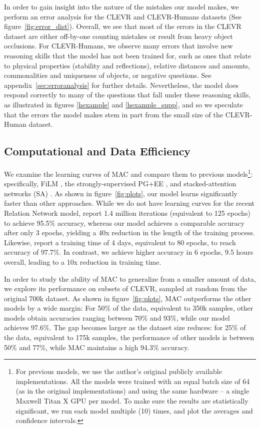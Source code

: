 \documentclass[fleqn]{article}
\newcommand{\figref}[1]{figure~\ref{fig:#1}}
\newcommand{\appref}[1]{appendix~\ref{sec:#1}}
\begin{document}
In order to gain insight into the nature of the mistakes our model makes, we perform an error analysis for the CLEVR and CLEVR-Humans datasets (See \figref{error_dist}). Overall, we see that most of the errors in the CLEVR dataset are either off-by-one counting mistakes or result from heavy object occlusions. For CLEVR-Humans, we observe many errors that involve new reasoning skills that the model has not been trained for, such as ones that relate to physical properties (stability and reflections), relative distances and amounts, commonalities and uniqueness of objects, or negative questions. See \appref{erroranalysis} for further details. Nevertheless, the model does respond correctly to many of the questions that fall under these reasoning skills, as illustrated in figures \ref{hexample} and \ref{hexample_supp}, and so we speculate that the errors the model makes stem in part from the small size of the CLEVR-Human dataset.

\subsection{Computational and Data Efficiency}

We examine the learning curves of MAC and compare them to previous models\footnote{For previous models, we use the author's original publicly available implementations. All the models were trained with an equal batch size of 64 (as in the original implementations) and using the same hardware -- a single Maxwell Titan X GPU per model. To make sure the results are statistically significant, we run each model multiple (10) times, and plot the averages and confidence intervals.}: specifically, FiLM \citep{film}, the strongly-supervised PG+EE \citep{pgee}, and stacked-attention networks (SA) \citep{pgee, saAtt}. As shown in \figref{plots}, our model learns significantly faster than other approaches. While we do not have learning curves for the recent Relation Network model, \citet{rn} report 1.4 million iterations (equivalent to 125 epochs) to achieve 95.5\% accuracy, whereas our model achieves a comparable accuracy after only 3 epochs, yielding a 40x reduction in the length of the training process. Likewise, \citet{film} report a training time of 4 days, equivalent to 80 epochs, to reach accuracy of 97.7\%. In contrast, we achieve higher accuracy in 6 epochs, 9.5 hours overall, leading to a 10x reduction in training time.

In order to study the ability of MAC to generalize from a smaller amount of data, we explore its performance on subsets of CLEVR, sampled at random from the original 700k dataset. As shown in \figref{plots}, MAC outperforms the other models by a wide margin: For 50\% of the data, equivalent to 350k samples, other models obtain accuracies ranging between 70\% and 93\%, while our model achieves 97.6\%. The gap becomes larger as the dataset size reduces: for 25\% of the data, equivalent to 175k samples, the performance of other models is between 50\% and 77\%, while MAC maintains a high 94.3\% accuracy. 
\end{document}
